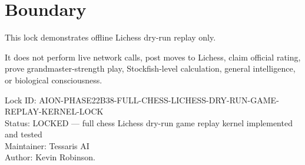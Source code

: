 \documentclass[11pt,a4paper]{article}
\begin{document}
\section{Boundary}

This lock demonstrates offline Lichess dry-run replay only.

It does not perform live network calls, post moves to Lichess, claim official rating, prove grandmaster-strength play, Stockfish-level calculation, general intelligence, or biological consciousness.

\bigskip

\noindent
Lock ID: AION-PHASE22B38-FULL-CHESS-LICHESS-DRY-RUN-GAME-REPLAY-KERNEL-LOCK\\
Status: LOCKED --- full chess Lichess dry-run game replay kernel implemented and tested\\
Maintainer: Tessaris AI\\
Author: Kevin Robinson.
\end{document}
